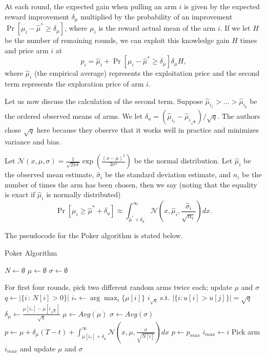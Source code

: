 \documentclass[12pt]{article}
\begin{document}
At each round, the expected gain when pulling an arm $i$ is given by the expected reward improvement $\delta_{\mu}$ multiplied by the probability of an
improvement $\Pr[\mu_i - \hat{\mu}^{*} \ge \delta_{\mu}]$, where $\mu_i$ is the reward actual mean of the arm $i$.  If we let $H$ be the number of remaining rounds, 
we can exploit this knowledge gain $H$ times and price arm $i$ at
$$
p_i = \hat{\mu}_i + \Pr[\mu_i - \hat{\mu}^{*} \ge \delta_{\mu}] \delta_{\mu} H,
$$
where $\hat{\mu}_i$ (the empirical average) represents the exploitation price and the second term represents the exploration price of arm $i$. 

Let us now discuss the calculation of the second term.  Suppose $\hat{\mu}_{i_1} > \ldots > \hat{\mu}_{i_q}$ be the ordered observed means of arms.  
We let $\delta_u = \left(\hat{\mu}_{i_1} - \hat{\mu}_{i_{\sqrt{q}}} \right)/\sqrt{q}$.  The authors chose $\sqrt{q}$ here because they observe that it works well
in practice and minimizes variance and bias.

Let $\mathcal{N}(x, \mu, \sigma) = \frac{1}{\sqrt{2 \pi \sigma}} \exp \left(\frac{(x - \mu)^2}{2 \sigma^2} \right)$ be the normal distribution.  
Let $\hat{\mu}_i$ be the observed mean estimate, $\hat{\sigma}_i$ be the standard deviation estimate, and $n_i$ be the number of times the arm has been chosen, then
we say (noting that the equality is exact if $\hat{\mu}_{i}$ is normally distributed)
$$
\Pr[\mu_i \ge \hat{\mu}^{*} + \delta_u] \approx \int_{\hat{\mu}^{*} + \delta_{\mu}}^{\infty} \mathcal{N}\left(x, \hat{\mu}_{i}, \frac{\hat{\sigma}_i}{\sqrt{n_i}} \right) dx.
$$

The pseudocode for the Poker algorithm is stated below.


\begin{algorithm}[H]
\scriptsize
  \caption{Poker Algorithm}
  $N \gets \emptyset$
  $\mu \gets \emptyset$ 
  $\sigma \gets \emptyset$

  \begin{algorithmic}
  \State For first four rounds, pick two different random arms twice each; update $\mu$ and $\sigma$
        \State $q \gets |\{i \, : \, N[i] > 0\}|$
        \State $i_{*} \gets \arg \max_{i} \{\mu[i]\}$
        \State $i_{\sqrt{q}}$ s.t. $|\{i : u[i] > u[j]\}| = \sqrt{q}$
        \State $\delta_{\mu} \gets \frac{\mu[i_{*}] - \mu[i_{\sqrt{q}}]}{\sqrt{q}}$ 
                \State $\mu \gets Avg(\mu)$ 
            \EndIf
                \State $\sigma \gets Avg(\sigma)$ 
            \EndIf
        \State $p \gets \mu + \delta_{\mu}(T - t) + \int_{\mu[i_*] + \delta_{\mu}}^{\infty} \mathcal{N}\left(x, \mu, \frac{\sigma}{\sqrt{N[i]}} \right) dx$
            \State$p \gets p_{max}$
            \State $i_{max} \gets i$ 
        \EndIf
        \EndFor
        \State Pick arm $i_{max}$ and update $\mu$ and $\sigma$
    \EndFor
  \end{algorithmic}
\end{algorithm}
\end{document}
